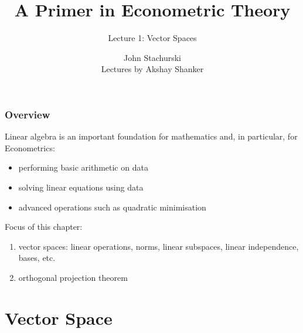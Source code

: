 



\title{A Primer in Econometric Theory}

\subtitle
{Lecture 1: Vector Spaces}


\author{John Stachurski \\ \tiny Lectures by Akshay Shanker}



\begin{frame}
  \titlepage
\end{frame}


\begin{frame}

    \frametitle{Overview}

    \vspace{2em}
    Linear algebra is an important foundation for mathematics and, in particular, for Econometrics: 
    
    \begin{itemize}
        \item performing basic arithmetic on data 
        \item solving linear equations using data
        \item advanced operations such as quadratic minimisation 
    \end{itemize}
    
    \vspace{1em}
    Focus of this chapter:
    \begin{enumerate}
        \item vector spaces: linear operations, norms, linear subspaces, 
        linear independence, bases, etc.
        \item orthogonal projection theorem 
    \end{enumerate}
 
\end{frame}

\section{Vector Space}

